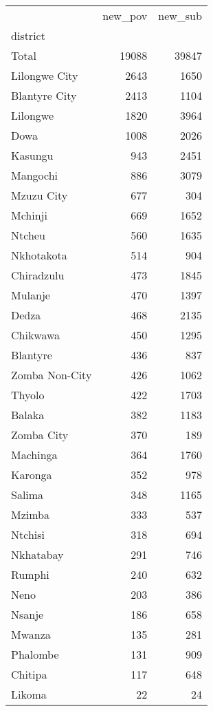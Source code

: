 \begin{tabular}{lrr}
\toprule
{} &  new\_pov &  new\_sub \\
district       &          &          \\
\midrule
Total          &    19088 &    39847 \\
Lilongwe City  &     2643 &     1650 \\
Blantyre City  &     2413 &     1104 \\
Lilongwe       &     1820 &     3964 \\
Dowa           &     1008 &     2026 \\
Kasungu        &      943 &     2451 \\
Mangochi       &      886 &     3079 \\
Mzuzu City     &      677 &      304 \\
Mchinji        &      669 &     1652 \\
Ntcheu         &      560 &     1635 \\
Nkhotakota     &      514 &      904 \\
Chiradzulu     &      473 &     1845 \\
Mulanje        &      470 &     1397 \\
Dedza          &      468 &     2135 \\
Chikwawa       &      450 &     1295 \\
Blantyre       &      436 &      837 \\
Zomba Non-City &      426 &     1062 \\
Thyolo         &      422 &     1703 \\
Balaka         &      382 &     1183 \\
Zomba City     &      370 &      189 \\
Machinga       &      364 &     1760 \\
Karonga        &      352 &      978 \\
Salima         &      348 &     1165 \\
Mzimba         &      333 &      537 \\
Ntchisi        &      318 &      694 \\
Nkhatabay      &      291 &      746 \\
Rumphi         &      240 &      632 \\
Neno           &      203 &      386 \\
Nsanje         &      186 &      658 \\
Mwanza         &      135 &      281 \\
Phalombe       &      131 &      909 \\
Chitipa        &      117 &      648 \\
Likoma         &       22 &       24 \\
\bottomrule
\end{tabular}
